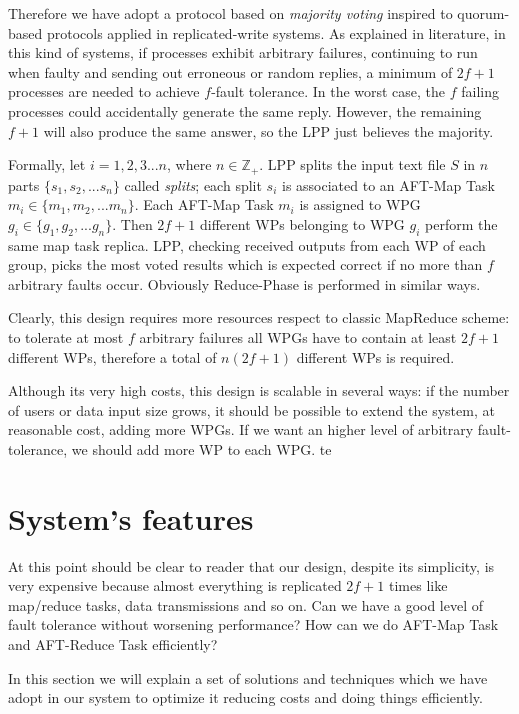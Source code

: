 \documentclass[sigchi]{acmart}
\begin{document}
Therefore we have adopt a protocol based on \textit{majority voting} inspired to quorum-based protocols applied in replicated-write systems. As explained in literature\citep{SDCC}, in this kind of systems, if processes exhibit arbitrary failures, continuing to run when faulty and sending out erroneous or random replies, a minimum of $2f+1$ processes are needed to achieve $f$-fault tolerance. In the worst case, the $f$ failing processes could accidentally generate the same reply. However, the remaining $f+1$ will also produce the same answer, so the LPP just believes the majority.

Formally, let $i = 1,2,3...n$, where $n \in \mathbb{Z}_+$. LPP splits the input text file $S$ in $n$ parts $\lbrace s_1, s_2, ... s_n \rbrace$ called \textit{splits}; each split $s_i$ is associated to an AFT-Map Task $m_i \in \lbrace m_1, m_2, ... m_n \rbrace$. Each AFT-Map Task $m_i$ is assigned to WPG $g_i \in \lbrace g_1, g_2, ... g_n \rbrace$. Then $2f+1$ different WPs belonging to WPG $g_i$ perform the same map task replica. LPP, checking received outputs from each WP of each group, picks the most voted results which is expected correct if no more than $f$ arbitrary faults occur. Obviously Reduce-Phase is performed in similar ways.

Clearly, this design requires more resources respect to classic MapReduce scheme: to tolerate at most $f$ arbitrary failures all WPGs have to contain at least $2f+1$ different WPs, therefore a total of $n(2f+1)$ different WPs is required. 

Although its very high costs, this design is scalable in several ways: if the number of users or data input size grows, it should be possible to extend the system, at reasonable cost, adding more WPGs. If we want an higher level of arbitrary fault-tolerance, we should add more WP to each WPG. te 

\section{System's features}

At this point should be clear to reader that our design, despite its simplicity, is very expensive because almost everything is replicated $2f + 1$ times like map/reduce tasks, data transmissions and so on. Can we have a good level of fault tolerance without worsening performance? How can we do AFT-Map Task and AFT-Reduce Task efficiently? 

In this section we will explain a set of solutions and techniques which we have adopt in our system to optimize it reducing costs and doing things efficiently.
\end{document}
